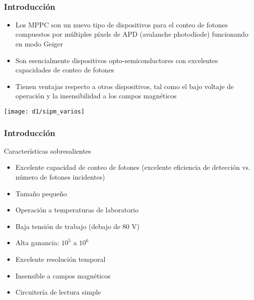 \documentclass{beamer}
\begin{document}
\begin{frame}
\begin{center}
\Huge{\color{blue}{Los SiPM (o MPPC)}} \\
\begin{center}
\end{center}
\end{center}
\end{frame}

\begin{frame}
\frametitle{Introducción}
\begin{block}{}
\begin{itemize}
\item Los MPPC son un nuevo tipo de dispositivos para el conteo de fotones
compuestos por múltiples píxels de APD (avalanche
photodiode) funcionando en modo Geiger
\item Son esencialmente dispositivos opto-semiconductores con excelentes
capacidades de conteo de fotones
\item Tienen ventajas respecto a otros dispositivos, tal como el bajo voltaje de
operación y la insensibilidad a los campos magnéticos 
\end{itemize}
\end{block}
\begin{center}
\texttt{[image: d1/sipm\_varios]}
\end{center}
\end{frame}

\begin{frame}
\frametitle{Introducción}
\begin{block}{Características sobresalientes}
\begin{itemize}
\item Excelente capacidad de conteo de fotones (excelente eficiencia de
detección vs. número de fotones incidentes)
\item Tamaño pequeño
\item Operación a temperaturas de laboratorio
\item Baja tensión de trabajo (debajo de 80 V)
\item Alta ganancia: $10^5$ a $10^6$
\item Excelente resolución temporal
\item Insensible a campos magnéticos
\item Circuitería de lectura simple
\end{itemize}
\end{block}
\end{frame}
\end{document}
